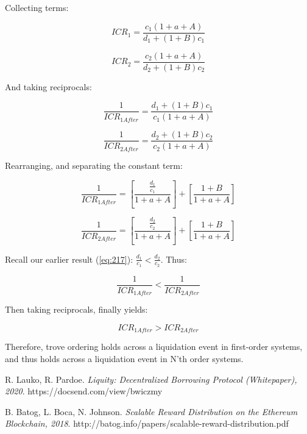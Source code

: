 \documentclass[reqno]{article}
\begin{document}
\bigskip
Collecting terms:

\begin{equation} 
    ICR_1=\frac{c_1\left(1+a+A\right)}{d_1+\left(1+B\right)c_1}
\end{equation}

\begin{equation} 
    ICR_2=\frac{c_2\left(1+a+A\right)}{d_2+\left(1+B\right)c_2}
\end{equation}

\bigskip
And taking reciprocals:

\begin{equation} 
    \frac{1}{ICR_{1After}}=\frac{d_1+\left(1+B\right)c_1}{c_1\left(1+a+A\right)}
\end{equation}

\begin{equation} 
    \frac{1}{ICR_{2After}}=\frac{d_2+\left(1+B\right)c_2}{c_2\left(1+a+A\right)}
\end{equation}

\bigskip
Rearranging, and separating the constant term:

\begin{equation} 
    \frac{1}{ICR_{1After}}=\left[\frac{\frac{d_1}{c_1}}{1+a+A}\right]+\left[\frac{1+B}{1+a+A}\right]
\end{equation}

\begin{equation} 
    \frac{1}{ICR_{2After}}=\left[\frac{\frac{d_2}{c_2}}{1+a+A}\right]+\left[\frac{1+B}{1+a+A}\right]
\end{equation}

\bigskip
Recall our earlier result (\ref{eq:217}): $\frac{d_1}{c_1}<\frac{d_2}{c_2}$. Thus:

\begin{equation} 
    \frac{1}{ICR_{1After}}<\frac{1}{ICR_{2After}}
\end{equation}

\bigskip
Then taking reciprocals, finally yields:

\begin{equation} 
    ICR_{1After}>ICR_{2After}
\end{equation}

\bigskip
Therefore, trove ordering holds across a liquidation event in first-order systems, and thus holds across a liquidation event in N’th order systems.

\bigskip

\begin{thebibliography}{9}

R. Lauko, R. Pardoe. 
\textit{Liquity: Decentralized Borrowing Protocol (Whitepaper), 2020}. 
https://docsend.com/view/bwiczmy

B. Batog, L. Boca, N. Johnson.
\textit{Scalable Reward Distribution on the Ethereum Blockchain, 2018}. 
http://batog.info/papers/scalable-reward-distribution.pdf


\end{thebibliography}
\end{document}
